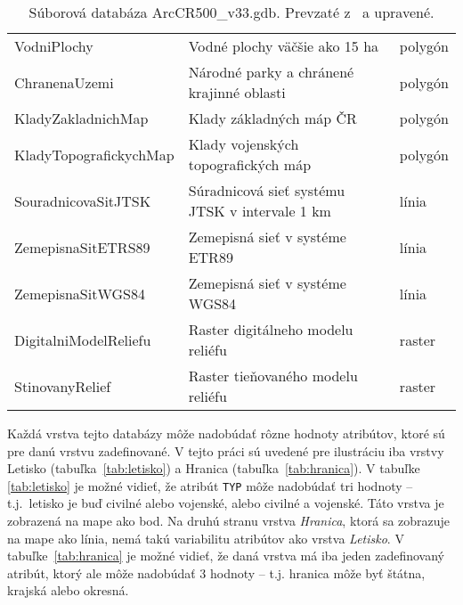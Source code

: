 \begin{table}[H]
\begin{tabular}{|l|l|l|}
    VodniPlochy            & Vodné plochy väčšie ako 15 ha                  & polygón            \\
    ChranenaUzemi          & Národné parky a chránené krajinné oblasti      & polygón            \\
    KladyZakladnichMap     & Klady základných máp ČR                        & polygón            \\
    KladyTopografickychMap & Klady vojenských topografických máp            & polygón            \\
    SouradnicovaSitJTSK    & Súradnicová sieť systému JTSK v intervale 1 km & línia              \\
    ZemepisnaSitETRS89     & Zemepisná sieť v systéme ETR89                 & línia              \\
    ZemepisnaSitWGS84      & Zemepisná sieť v systéme WGS84                 & línia              \\
    DigitalniModelReliefu  & Raster digitálneho modelu reliéfu              & raster             \\
    StinovanyRelief        & Raster tieňovaného modelu reliéfu              & raster             \\ \hline
\end{tabular}
\caption{Súborová databáza ArcCR500\_v33.gdb. Prevzaté z~\cite{arcgis} a upravené.}
\label{tab:arccr500}
\end{table}

Každá vrstva tejto databázy môže nadobúdať rôzne hodnoty atribútov, ktoré sú pre danú vrstvu zadefinované. V tejto práci sú uvedené pre ilustráciu iba vrstvy Letisko (tabuľka~\ref{tab:letisko}) a Hranica (tabuľka~\ref{tab:hranica}). V tabuľke \ref{tab:letisko} je možné vidieť, že atribút \texttt{TYP} môže nadobúdať tri hodnoty \--- t.j.~letisko je buď civilné alebo vojenské, alebo civilné a vojenské. Táto vrstva je zobrazená na mape ako bod. Na druhú stranu vrstva \emph{Hranica}, ktorá sa zobrazuje na mape ako línia, nemá takú variabilitu atribútov ako vrstva \emph{Letisko}. V tabuľke~\ref{tab:hranica} je možné vidieť, že daná vrstva má iba jeden zadefinovaný atribút, ktorý ale môže nadobúdať 3 hodnoty \--- t.j. hranica môže byť štátna, krajská alebo okresná.

